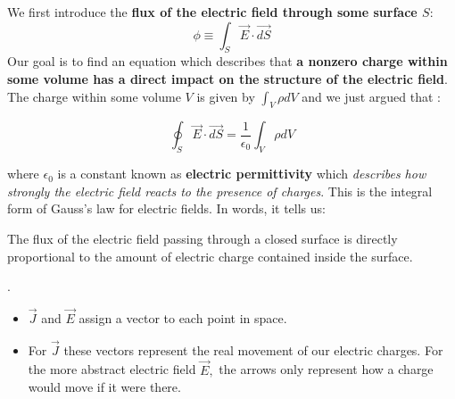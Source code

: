 We first introduce the \textbf{flux of the electric field through some surface $S$}:
\begin{equation}
\phi \equiv \int_{S} \vec{E} \cdot \overrightarrow{d S}
\end{equation}
Our goal is to find an equation which describes that \textbf{a nonzero charge within some volume has a direct impact on the structure of the electric field}. The charge within some volume $V$ is given by $\int_{V} \rho d V$ and we just argued that :
\begin{qt}
    \begin{equation}
\oint_{S} \vec{E} \cdot \overrightarrow{d S}=\frac{1}{\epsilon_{0}} \int_{V} \rho d V
\end{equation}
\end{qt}
where $\epsilon_{0}$ is a constant known as \textbf{electric permittivity} which \textit{describes how strongly the electric field reacts to the presence of charges}. This is the integral form of Gauss's law for electric fields. In words, it tells us:
\begin{qt}
    The flux of the electric field passing through a closed surface is directly proportional to the amount of electric charge contained inside the surface.
\end{qt}
.
\begin{qt}
    \begin{itemize}
        \item $\vec{J}$ and $\vec{E}$ assign a vector to each point in space.
        \item For $\vec{J}$ these vectors represent the real movement of our electric charges. For the more abstract electric field $\vec{E},$ the arrows only represent how a charge would move if it were there.
        
    \end{itemize}
\end{qt}

